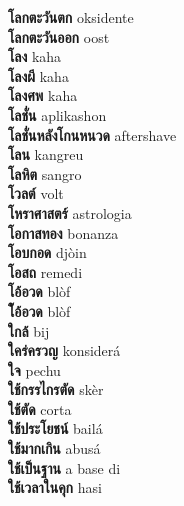 \textbf{ โลกตะวันตก  } oksidente \\
\textbf{ โลกตะวันออก  } oost \\
\textbf{ โลง  } kaha \\
\textbf{ โลงผี  } kaha \\
\textbf{ โลงศพ  } kaha \\
\textbf{ โลชั่น  } aplikashon \\
\textbf{ โลชั่นหลังโกนหนวด  } aftershave \\
\textbf{ โลน  } kangreu \\
\textbf{ โลหิต  } sangro \\
\textbf{ โวลต์  } volt \\
\textbf{ โหราศาสตร์  } astrologia \\
\textbf{ โอกาสทอง  } bonanza \\
\textbf{ โอบกอด  } djòin \\
\textbf{ โอสถ  } remedi \\
\textbf{ โอ้อวด  } blòf \\
\textbf{ โ้อ้อวด  } blòf \\
\textbf{ ใกล้  } bij \\
\textbf{ ใคร่ครวญ  } konsiderá \\
\textbf{ ใจ  } pechu \\
\textbf{ ใช้กรรไกรตัด  } skèr \\
\textbf{ ใช้ตัด  } corta \\
\textbf{ ใช้ประโยชน์  } bailá \\
\textbf{ ใช้มากเกิน  } abusá \\
\textbf{ ใช้เป็นฐาน  } a base di \\
\textbf{ ใช้เวลาในคุก  } hasi \\
